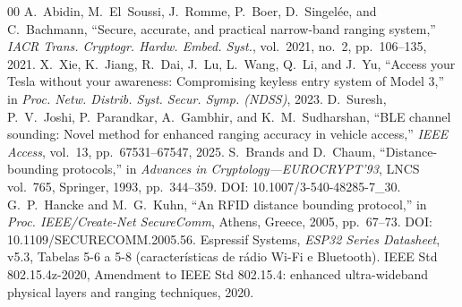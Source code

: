 \documentclass{ieeeaccess}
\begin{document}
\begin{thebibliography}{00}
 A.~Abidin, M.~El~Soussi, J.~Romme, P.~Boer, D.~Singel\'ee, and C.~Bachmann, ``Secure, accurate, and practical narrow-band ranging system,'' \emph{IACR Trans. Cryptogr. Hardw. Embed. Syst.}, vol.~2021, no.~2, pp.~106--135, 2021.
 X.~Xie, K.~Jiang, R.~Dai, J.~Lu, L.~Wang, Q.~Li, and J.~Yu, ``Access your Tesla without your awareness: Compromising keyless entry system of Model 3,'' in \emph{Proc. Netw. Distrib. Syst. Secur. Symp. (NDSS)}, 2023.
 D.~Suresh, P.~V.~Joshi, P.~Parandkar, A.~Gambhir, and K.~M.~Sudharshan, ``BLE channel sounding: Novel method for enhanced ranging accuracy in vehicle access,'' \emph{IEEE Access}, vol.~13, pp.~67531--67547, 2025.
 S.~Brands and D.~Chaum, ``Distance-bounding protocols,'' in \emph{Advances in Cryptology---EUROCRYPT'93}, LNCS vol.~765, Springer, 1993, pp.~344--359. DOI: 10.1007/3-540-48285-7\_30.
 G.~P.~Hancke and M.~G.~Kuhn, ``An RFID distance bounding protocol,'' in \emph{Proc. IEEE/Create-Net SecureComm}, Athens, Greece, 2005, pp.~67--73. DOI: 10.1109/SECURECOMM.2005.56.
 Espressif Systems, \emph{ESP32 Series Datasheet}, v5.3, Tabelas 5-6 a 5-8 (características de rádio Wi-Fi e Bluetooth).
 IEEE Std 802.15.4z-2020, Amendment to IEEE Std 802.15.4: enhanced ultra-wideband physical layers and ranging techniques, 2020.
\end{thebibliography}

\EOD
\end{document}
